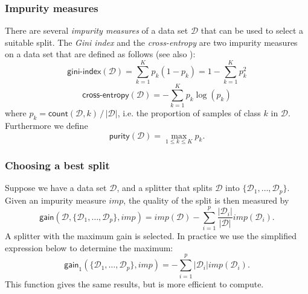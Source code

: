 \documentclass{article}
\newcommand{\func}[1]{\ensuremath{\textsf{#1}}} %
\newcommand{\var}[1]{\ensuremath{\textit{#1}}} %
\newcommand{\set}[1]{\ensuremath{\{ #1 \} }} %
\begin{document}
\subsubsection*{Impurity measures}
There are several \emph{impurity measures} of a data set $\mathcal{D}$ that can be used to select a suitable split.
The \emph{Gini index} and the \emph{cross-entropy} are two impurity measures on a data set that are defined as follows (see also \cite{Hastie2009}):
\[
\func{gini-index}(\mathcal{D}) 
  = \sum\limits_{k=1}^K p_k (1 - p_k) 
  = 1 - \sum\limits_{k=1}^K p_k^2
\]
\[
\func{cross-entropy}(\mathcal{D}) = - \sum\limits_{k=1}^K 
  p_k \log(p_k)
\]
where $p_k = \func{count}(\mathcal{D},k) \, / \, |\mathcal{D}|$, i.e. the proportion of samples of class $k$ in $\mathcal{D}$. Furthermore we define
\[
\func{purity}(\mathcal{D}) = \max\limits_{1 \leq k \leq K} p_k.
\]



\subsubsection*{Choosing a best split}
Suppose we have a data set $\mathcal{D}$, and a splitter that splits $\mathcal{D}$ into $\set{ \mathcal{D}_1, \ldots, \mathcal{D}_p }$. Given an impurity measure $\var{imp}$, the quality of the split is then measured by
\[
\func{gain}(\mathcal{D}, \set{ \mathcal{D}_1, \ldots, \mathcal{D}_p }, \var{imp}) = \var{imp}(\mathcal{D}) - \sum\limits_{i=1}^p \frac{|\mathcal{D}_i|}{|\mathcal{D}|} \var{imp}(\mathcal{D}_i).
\]
A splitter with the maximum gain is selected. In practice we use
the simplified expression below to determine the maximum:
\[
\func{gain}_1(\set{ \mathcal{D}_1, \ldots, \mathcal{D}_p }, \var{imp}) = - \sum\limits_{i=1}^p |\mathcal{D}_i| \var{imp}(\mathcal{D}_i).
\]
This function gives the same results, but is more efficient to compute.
\end{document}
